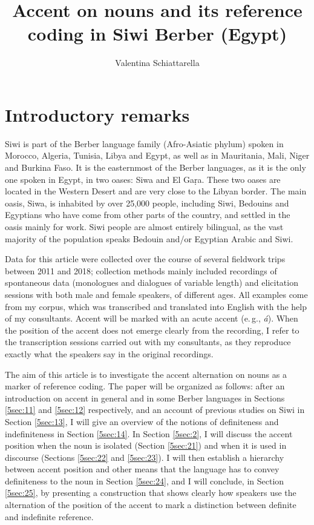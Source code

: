 \documentclass[output=paper]{langsci/langscibook}
\author{Valentina Schiattarella\affiliation{University of Naples, L'Orientale}}
\title{Accent on nouns and its reference coding in Siwi Berber (Egypt)}
\begin{document}
\maketitle


\section{Introductory remarks}\label{5sec:1}

Siwi is part of the Berber language family (Afro-Asiatic phylum) spoken in Morocco, Algeria, Tunisia, Libya and Egypt, as well as in Mauritania, Mali, Niger and Burkina Faso. It is the easternmost of the Berber languages, as it is the only one spoken in Egypt, in two oases: Siwa and El Gaṛa. These two oases are located in the Western Desert and are very close to the Libyan border. The main oasis, Siwa, is inhabited by over 25,000 people, including Siwi, Bedouins and Egyptians who have come from other parts of the country, and settled in the oasis mainly for work. Siwi people are almost entirely bilingual, as the vast majority of the population speaks Bedouin and/or Egyptian Arabic and Siwi. 

Data for this article were collected over the course of several fieldwork trips between 2011 and 2018; collection methods mainly included recordings of spontaneous data (monologues and dialogues of variable length) and elicitation sessions with both male and female speakers, of different ages. All examples come from my corpus, which was transcribed and translated into English with the help of my consultants. Accent will be marked with an acute accent (e.\,g., {\emph{á}}). When the position of the accent does not emerge clearly from the recording, I refer to the transcription sessions carried out with my consultants, as they reproduce exactly what the speakers say in the original recordings.

The aim of this article is to investigate the accent alternation on nouns as a marker of reference coding. The paper will be organized as follows: after an introduction on accent in general and in some Berber languages in Sections \ref{5sec:11} and \ref{5sec:12} respectively, and an account of previous studies on Siwi in Section \ref{5sec:13}, I will give an overview of the notions of definiteness and indefiniteness in Section \ref{5sec:14}. In Section \ref{5sec:2}, I will discuss the accent position when the noun is isolated (Section \ref{5sec:21}) and when it is used in discourse (Sections \ref{5sec:22} and \ref{5sec:23}). I will then establish a hierarchy between accent position and other means that the language has to convey definiteness to the noun in Section \ref{5sec:24}, and I will conclude, in Section \ref{5sec:25}, by presenting a construction that shows clearly how speakers use the alternation of the position of the accent to mark a distinction between definite and indefinite reference.
\end{document}
